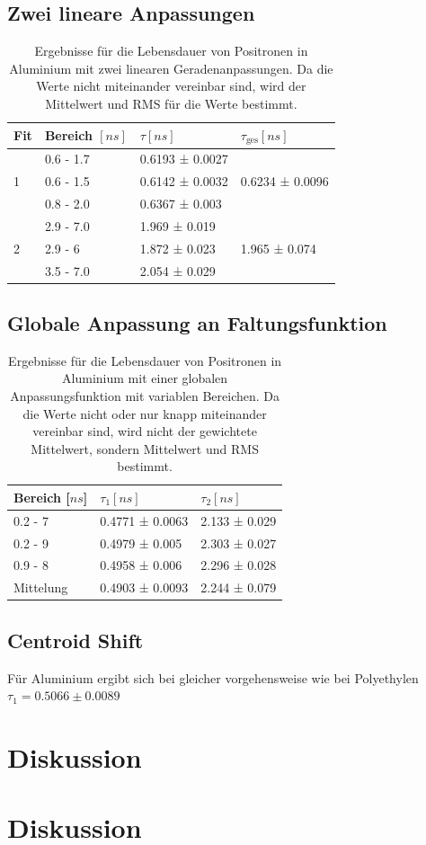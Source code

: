 \documentclass[a4paper,12pt]{article}
\begin{document}
\subsection{Zwei lineare Anpassungen}
\begin{table}[h]
	\begin{tabular}{l |l l ||l}
			Fit& Bereich $[\si{ns}]$ & $τ [\si{ns}]$ & $τ_\text{ges} [\si{ns}]$ \\
		\hline
		\multirow{3}{*}{1} & 0.6 - 1.7 &  0.6193 ± 0.0027   &\multirow{3}{*}{  0.6234 ± 0.0096}\\
	 & 0.6 - 1.5 &  0.6142 ± 0.0032   &\\
	 & 0.8 - 2.0 &  0.6367 ± 0.003   &\\
	 \hline
	 \multirow{3}{*}{2}  & 2.9 - 7.0 &  1.969 ± 0.019   &\multirow{3}{*}{1.965 ± 0.074 }\\
	 & 2.9 - 6 &  1.872 ± 0.023   &\\
	 & 3.5 - 7.0 &  2.054 ± 0.029   &
	\end{tabular}
	\centering
	\caption{Ergebnisse für die Lebensdauer von Positronen in Aluminium mit zwei linearen
		Geradenanpassungen. Da die Werte nicht miteinander vereinbar sind, wird der Mittelwert und
	RMS für die Werte bestimmt.}
	\label{tab:linearPoly}
\end{table}
\subsection{Globale Anpassung an Faltungsfunktion}

\begin{table}[h]
	\begin{tabular}{l |l l}
		Bereich [$\si{ns}$] & $τ_1 [\si{ns}]$ & $τ_2 [\si{ns}]$ \\
		\hline
0.2 - 7 &  0.4771 ± 0.0063   &  2.133 ± 0.029  \\
0.2 - 9 &  0.4979 ± 0.005   &  2.303 ± 0.027  \\
0.9 - 8 &  0.4958 ± 0.006   &  2.296 ± 0.028  \\
		\hline
		\hline
		Mittelung & 0.4903 ± 0.0093 & 2.244 ± 0.079
	\end{tabular}
	\centering
	\caption{Ergebnisse für die Lebensdauer von Positronen in Aluminium mit einer globalen
	Anpassungsfunktion mit variablen Bereichen. Da die Werte nicht oder nur knapp miteinander
		vereinbar sind, wird nicht der gewichtete Mittelwert, sondern Mittelwert und RMS bestimmt.}
	\label{tab:globalPoly}
\end{table}
\subsection{Centroid Shift}
Für Aluminium ergibt sich bei gleicher vorgehensweise wie bei Polyethylen $τ_1 = 0.5066 \pm 0.0089$ 
\section{Diskussion}

\section{Diskussion}


{}
\end{document}

